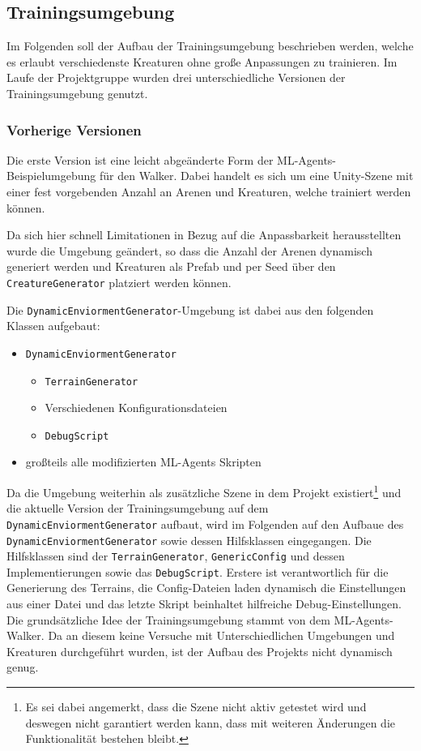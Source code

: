 
\subsection{Trainingsumgebung}
Im Folgenden soll der Aufbau der Trainingsumgebung beschrieben werden, welche es erlaubt verschiedenste Kreaturen ohne große Anpassungen zu trainieren. Im Laufe der Projektgruppe wurden drei unterschiedliche Versionen der Trainingsumgebung genutzt. 

\subsubsection{Vorherige Versionen}
Die erste Version ist eine leicht abgeänderte Form der ML-Agents-Beispielumgebung für den Walker. Dabei handelt es sich um eine Unity-Szene mit einer fest vorgebenden Anzahl an Arenen und Kreaturen, welche trainiert werden können.

Da sich hier schnell Limitationen in Bezug auf die Anpassbarkeit herausstellten wurde die Umgebung geändert, so dass die Anzahl der Arenen dynamisch generiert werden und Kreaturen als Prefab und per Seed über den \texttt{CreatureGenerator} platziert werden können. 

Die  \texttt{DynamicEnviormentGenerator}-Umgebung ist dabei aus den folgenden Klassen aufgebaut:

\begin{itemize}
	\item \texttt{DynamicEnviormentGenerator}
	\begin{itemize}
		\item \texttt{TerrainGenerator} %
		\item Verschiedenen Konfigurationsdateien
		\item \texttt{DebugScript}
	\end{itemize}
	\item großteils alle modifizierten ML-Agents Skripten
\end{itemize} 

Da die Umgebung weiterhin als zusätzliche Szene in dem Projekt existiert\footnote{Es sei dabei angemerkt, dass die Szene nicht aktiv getestet wird und deswegen nicht garantiert werden kann, dass mit weiteren Änderungen die Funktionalität bestehen bleibt.} und die aktuelle Version der Trainingsumgebung auf dem \texttt{DynamicEnviormentGenerator} aufbaut, wird im Folgenden auf den Aufbaue des \texttt{DynamicEnviormentGenerator} sowie dessen Hilfsklassen eingegangen. Die Hilfsklassen sind der \texttt{TerrainGenerator}, \texttt{GenericConfig} und dessen Implementierungen sowie das \texttt{DebugScript}. Erstere ist verantwortlich für die Generierung des Terrains, die Config-Dateien laden dynamisch die Einstellungen aus einer Datei und das letzte Skript beinhaltet hilfreiche Debug-Einstellungen. Die grundsätzliche Idee der Trainingsumgebung stammt von dem ML-Agents-Walker. Da an diesem keine Versuche mit Unterschiedlichen Umgebungen und Kreaturen durchgeführt wurden, ist der Aufbau des Projekts nicht dynamisch genug. 

